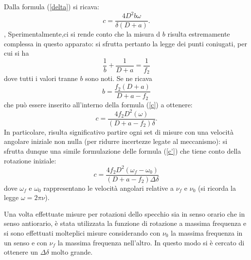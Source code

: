 Dalla formula (\ref{delta}) si ricava:
\begin{equation}
    c=\frac{4D^2b\omega}{\delta(D+a)}.
    \label{c}
\end{equation},
Sperimentalmente,ci si rende conto che la misura d $b$ risulta estremamente complessa in questo apparato: si sfrutta pertanto la legge dei punti coniugati, per cui si ha
\begin{equation}
    \frac{1}{b}+\frac{1}{D+a}=\frac{1}{f_2}
\end{equation}
dove tutti i valori tranne $b$ sono noti. Se ne ricava
\begin{equation}
    b=\frac{f_2(D+a)}{D+a-f_2}
\end{equation}
che può essere inserito all'interno della formula (\ref{c}) a ottenere:
\begin{equation}
    c=\frac{4f_2D^2(\omega)}{(D+a-f_2)\delta}.
    \label{c'}
\end{equation}
In particolare, risulta significativo partire ogni set di misure con una velocità angolare iniziale non nulla (per ridurre incertezze legate al meccanismo): si sfrutta dunque una simile formulazione delle formula (\ref{c'}) che tiene conto della rotazione iniziale:
\begin{equation}
    c=\frac{4f_2D^2(\omega_f-\omega_0)}{(D+a-f_2)\Delta\delta}
\end{equation}
dove $\omega_f$ e $\omega_0$ rappresentano le velocità angolari relative a $\nu_f$ e $\nu_0$ (si ricorda la legge $\omega=2\pi\nu$).

Una volta effettuate misure per rotazioni dello specchio sia in senso orario che in senso antiorario, è stata utilizzata la funzione di rotazione a massima frequenza e si sono effettuati molteplici misure considerando con $\nu_0$ la massima frequenza in un senso e con $\nu_f$ la massima frequenza nell'altro. In questo modo si è cercato di ottenere un $\Delta\delta$ molto grande.